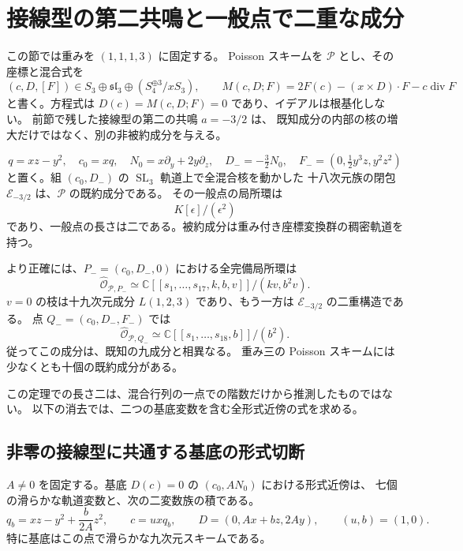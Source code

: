 \section{接線型の第二共鳴と一般点で二重な成分}
\label{sec:tangent-double-v34}

この節では重みを $(1,1,1,3)$ に固定する。
Poisson スキームを $\mathcal P$ とし、その座標と混合式を
\[
 (c,D,[F])\in S_3\oplus\mathfrak{sl}_3\oplus(S_4^{\oplus3}/xS_3),
 \qquad M(c,D;F)=2F(c)-(x\times D)\cdot F-c\operatorname{div}F
\]
と書く。方程式は $D(c)=M(c,D;F)=0$ であり、イデアルは根基化しない。
前節で残した接線型の第二の共鳴 $a=-3/2$ は、
既知成分の内部の核の増大だけではなく、別の非被約成分を与える。

\begin{theorem}[一般点で二重な十八次元成分]
\label{thm:tangent-double-v34}
\[
 q=xz-y^2,\quad c_0=xq,\quad N_0=x\partial_y+2y\partial_z,\quad
 D_-=-\tfrac32N_0,\quad F_-=(0,\tfrac12y^3z,y^2z^2)
\]
と置く。組 $(c_0,D_-)$ の $\operatorname{SL}_3$ 軌道上で全混合核を動かした
十八次元族の閉包 $\mathcal E_{-3/2}$ は、$\mathcal P$ の既約成分である。
その一般点の局所環は
\[
 K[\epsilon]/(\epsilon^2)
\]
であり、一般点の長さは二である。被約成分は重み付き座標変換群の稠密軌道を持つ。

より正確には、$P_-=(c_0,D_-,0)$ における全完備局所環は
\begin{equation}
 \widehat{\mathcal O}_{\mathcal P,P_-}
 \simeq
 \mathbb C[[s_1,\ldots,s_{17},k,b,v]]/(kv,b^2v).
 \label{eq:tangent-double-origin-v34}
\end{equation}
$v=0$ の枝は十九次元成分 $L(1,2,3)$ であり、もう一方は
$\mathcal E_{-3/2}$ の二重構造である。
点 $Q_-=(c_0,D_-,F_-)$ では
\begin{equation}
 \widehat{\mathcal O}_{\mathcal P,Q_-}
 \simeq\mathbb C[[s_1,\ldots,s_{18},b]]/(b^2).
 \label{eq:tangent-double-nonzero-v34}
\end{equation}
従ってこの成分は、既知の九成分と相異なる。
重み三の Poisson スキームには少なくとも十個の既約成分がある。
\end{theorem}

この定理での長さ二は、混合行列の一点での階数だけから推測したものではない。
以下の消去では、二つの基底変数を含む全形式近傍の式を求める。

\subsection{非零の接線型に共通する基底の形式切断}

\begin{lemma}
\label{lem:tangent-base-slice-v34}
$A\ne0$ を固定する。基底 $D(c)=0$ の $(c_0,AN_0)$ における形式近傍は、
七個の滑らかな軌道変数と、次の二変数族の積である。
\begin{equation}
 q_b=xz-y^2+\frac{b}{2A}z^2,\qquad
 c=u xq_b,\qquad D=(0,Ax+bz,2Ay),\qquad (u,b)=(1,0).
 \label{eq:tangent-base-slice-v34}
\end{equation}
特に基底はこの点で滑らかな九次元スキームである。
\end{lemma}

